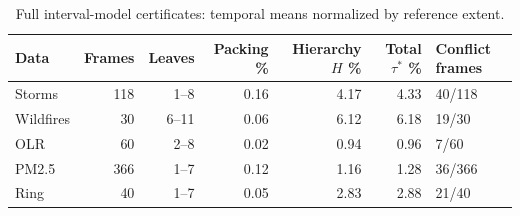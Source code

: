 \begin{table}[H]
\caption{Full interval-model certificates: temporal means normalized by reference extent.}\label{tab:cert}
\centering\footnotesize
\setlength{\tabcolsep}{3pt}
\begin{tabular}{lrrrrrl}\toprule
Data & Frames & Leaves & Packing \% & Hierarchy $H$ \% & Total $\tau^*$ \% & Conflict frames\\\midrule
Storms & 118 & 1--8 & 0.16 & 4.17 & 4.33 & 40/118\\
Wildfires & 30 & 6--11 & 0.06 & 6.12 & 6.18 & 19/30\\
OLR & 60 & 2--8 & 0.02 & 0.94 & 0.96 & 7/60\\
PM2.5 & 366 & 1--7 & 0.12 & 1.16 & 1.28 & 36/366\\
Ring & 40 & 1--7 & 0.05 & 2.83 & 2.88 & 21/40\\
\bottomrule\end{tabular}
\par{}
\end{table}
